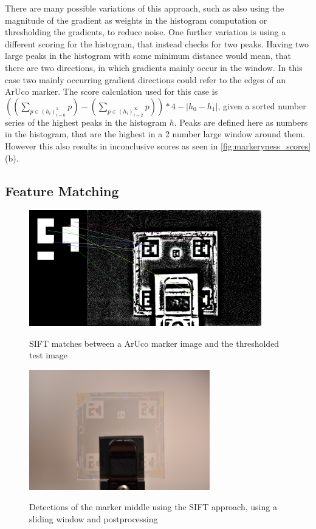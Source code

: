 \documentclass[10pt]{book}
\begin{document}
There are many possible variations of this approach, such as also using the magnitude of the gradient as weights in the histogram computation or thresholding the gradients, to reduce noise. One further variation is using a different scoring for the histogram, that instead checks for two peaks. Having two large peaks in the histogram with some minimum distance would mean, that there are two directions, in which gradients mainly occur in the window. In this case two mainly occurring gradient directions could refer to the edges of an \ac{ArUco} marker. The score calculation used for this case is $((\sum_{p \in (h_i)^1_{i=0}}p) - (\sum_{p \in (h_i)^\infty_{i=2}}p)) * 4 - |h_0 - h_1|$, given a sorted number series of the highest peaks in the histogram $h$. Peaks are defined here as numbers in the histogram, that are the highest in a 2 number large window around them. However this also results in inconclusive scores as seen in \autoref{fig:markeryness_scores} (b).

\subsection{Feature Matching}

\begin{figure}
  \caption{\ac{SIFT} matches between a \ac{ArUco} marker image and the thresholded test image}
  \includegraphics[width=0.9\textwidth]{image/classic_sift_matches}
  \label{fig:classic_sift_matches}
\end{figure}

\begin{figure}
  \caption{Detections of the marker middle using the \ac{SIFT} approach, using a sliding window and postprocessing}
  \includegraphics[width=0.7\textwidth]{image/classic_sift_final_matches}
  \label{fig:classic_sift_final_matches}
\end{figure}
\end{document}
